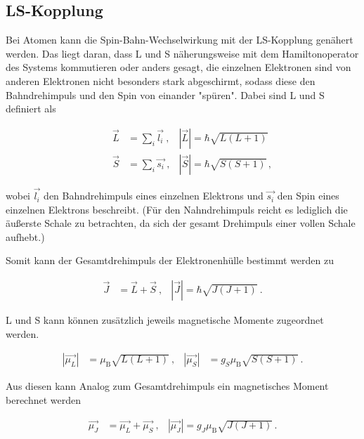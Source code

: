 \subsection{LS-Kopplung}
Bei Atomen kann die Spin-Bahn-Wechselwirkung mit der LS-Kopplung genähert werden. Das liegt daran, dass L und S näherungsweise mit dem Hamiltonoperator des Systems
kommutieren oder anders gesagt, die einzelnen Elektronen sind von anderen Elektronen nicht besonders stark abgeschirmt, sodass diese den Bahndrehimpuls
und den Spin von einander "spüren". Dabei sind L und S definiert als 

\begin{align}
    \qquad \vec{L} &= \sum_i \vec{l_i} \:, & |\vec{L}| = \hbar \sqrt{L(L+1)}\\
    \qquad \vec{S} &= \sum_i \vec{s_i} \:, & |\vec{S}| = \hbar \sqrt{S(S+1)} \, , 
\end{align}
\vspace{-10pt}

\noindent
wobei $\vec{l_i}$ den Bahndrehimpuls eines einzelnen Elektrons und $\vec{s_i}$ den Spin eines einzelnen Elektrons beschreibt. (Für den Nahndrehimpuls reicht es lediglich
die äußerste Schale zu betrachten, da sich der gesamt Drehimpuls einer vollen Schale aufhebt.)

\noindent
Somit kann der Gesamtdrehimpuls der Elektronenhülle bestimmt werden zu 

\vspace{-15pt}
\begin{align}
    \vec{J} &= \vec{L} + \vec{S} \:, & |\vec{J}| = \hbar \sqrt{J(J+1)} \: .
\end{align}


\noindent
L und S kann können zusätzlich jeweils magnetische Momente zugeordnet werden. 

\vspace{-15pt}
\begin{align}
 |\vec{\mu_L}|& = \mu_\text{B} \sqrt{L(L+1)} \:, &  |\vec{\mu_S}|& = g_S \mu_\text{B} \sqrt{S(S+1)}\: .
\end{align}

\noindent
Aus diesen kann Analog zum Gesamtdrehimpuls ein magnetisches Moment berechnet werden

\vspace{-15pt}
\begin{align}
    \vec{\mu_J} &= \vec{\mu_L} + \vec{\mu_S} \:, & |\vec{\mu_J}| = g_J \mu_\text{B} \sqrt{J(J+1)} \, .
\end{align}

